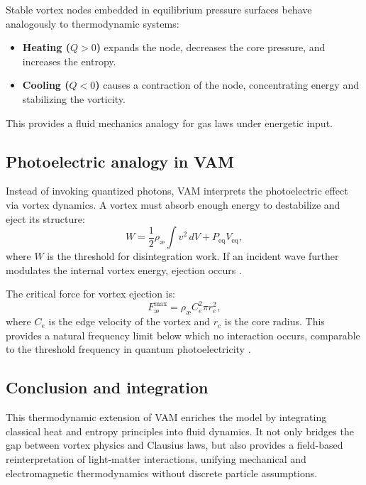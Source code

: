 Stable vortex nodes embedded in equilibrium pressure surfaces behave analogously to thermodynamic systems:
\begin{itemize}
    \item \textbf{Heating ($Q > 0$)} expands the node, decreases the core pressure, and increases the entropy. \item \textbf{Cooling ($Q < 0$)} causes a contraction of the node, concentrating energy and stabilizing the vorticity.
\end{itemize}
This provides a fluid mechanics analogy for gas laws under energetic input.

\subsection{Photoelectric analogy in VAM}

Instead of invoking quantized photons, VAM interprets the photoelectric effect via vortex dynamics. A vortex must absorb enough energy to destabilize and eject its structure:
\begin{equation}
    W = \frac{1}{2} \rho_\text{\ae} \int v^2 \, dV + P_\text{eq} V_\text{eq},\label{eq:photoelectric_work}
\end{equation}
where $W$ is the threshold for disintegration work. If an incident wave further modulates the internal vortex energy, ejection occurs \cite{iskandarani2025swirl}.

The critical force for vortex ejection is:
\begin{equation}
    F^{\text{max}}_{\text{\ae}} = \rho_\text{\ae} C_e^2 \pi r_c^2,\label{eq:critical_force}
\end{equation}
where $C_e$ is the edge velocity of the vortex and $r_c$ is the core radius. This provides a natural frequency limit below which no interaction occurs, comparable to the threshold frequency in quantum photoelectricity \cite{einstein1905photoelectric}.

\subsection*{Conclusion and integration}

This thermodynamic extension of VAM enriches the model by integrating classical heat and entropy principles into fluid dynamics. It not only bridges the gap between vortex physics and Clausius laws, but also provides a field-based reinterpretation of light-matter interactions, unifying mechanical and electromagnetic thermodynamics without discrete particle assumptions.